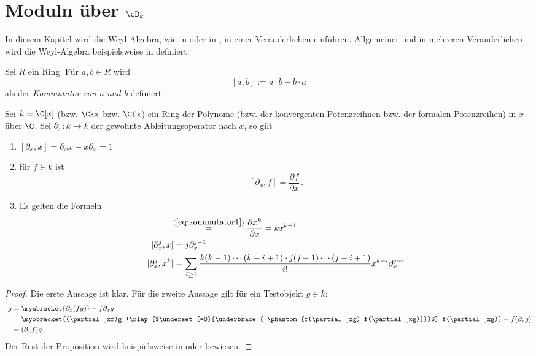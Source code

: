 \chapter{Moduln über $\cD_k$}
In diesem Kapitel wird die Weyl Algebra, wie in
\cite[Chapter~1]{sabbah_cimpa90} oder in \cite[Kapittel~2]{ZulaBarbara} , in
einer Veränderlichen einführen.  Allgemeiner und in mehreren Veränderlichen
wird die Weyl-Algebra beispielsweise in \cite[Chapter~1]{coutinho1995primer}
definiert.

\begin{defn}[Kommutator]%
Sei $R$ ein Ring. Für $a,b\in R$ wird
\[[a,b]:=a\cdot b-b\cdot a\]
als der \emph{Kommutator von a und b} definiert.
\end{defn}

\begin{prop} \label{prop:d-modul-komutator-regeln}
Sei $k= \C[x]$ (bzw. $\Ckx$ bzw. $\Cfx$) ein Ring der Polynome (bzw. der
konvergenten Potenzreihnen bzw. der formalen Potenzreihen) in $x$ über $\C$.
Sei $\partial_x:k\rightarrow k$ der gewohnte Ableitungsoperator nach $x$, so
gilt
\begin{enumerate}
\item $[ \partial_x,x] = \partial_xx-x\partial_x=1 $
\item für $f\in k$ ist
\begin{equation} \label{eq:kommutator1}
[\partial_x,f] = \frac{\partial f}{\partial x} \,. 
\end{equation}
\item Es gelten die Formeln
\begin{align}
[\partial_x,x^k] &\!\!\overset{(\ref{eq:kommutator1})}{=}
  \frac{\partial x^k}{\partial x} = kx^{k-1}
  \label{eq:kommutator1b}\\
[\partial_x^j,x]   &= j\partial_x^{j-1}
  \label{eq:kommutator2}\\
[\partial_x^j,x^k] &= \sum_{i\geq1}\frac{k(k-1)\cdots(k-i+1)
  \cdot j(j-1)\cdots(j-i+1)}{i!}x^{k-i}\partial_x^{j-i}
  \label{eq:kommutator3}
\end{align}
\end{enumerate}
\end{prop}
\begin{proof}
Die erste Aussage ist klar. Für die zweite Aussage gilt für ein Testobjekt
$g\in k$:
\begin{align*}
[\partial_x,f]\cdot g&=\myubracket{\partial_x(fg)}-f\partial_xg
\\&= \myobracket{(\partial_xf)g
  +\rlap{$\underset{=0}{\underbrace{ \phantom{f(\partial_xg)-f(\partial_xg)}}}$}
  f(\partial_xg)}-f(\partial_xg)
\\&= (\partial_xf)g \,.
\end{align*}
Der Rest der Proposition wird beispielsweise in \cite[1.2.4.]{sabbah_cimpa90}
oder \cite[Kor 2.8]{ZulaBarbara} bewiesen.
\end{proof}

